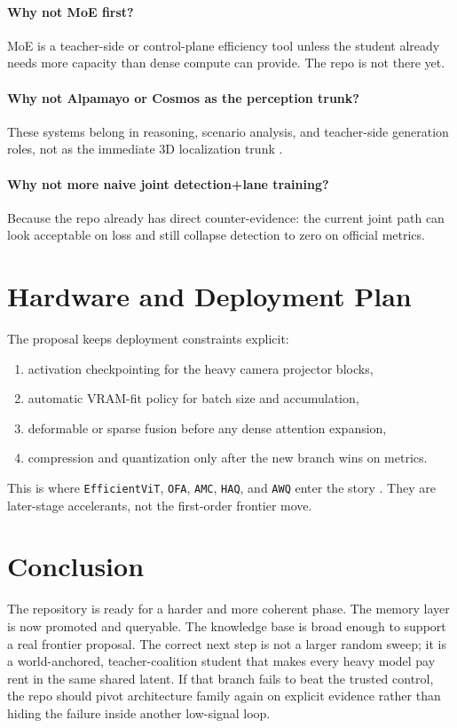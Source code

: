 \documentclass[11pt]{article}
\begin{document}
\paragraph{Why not MoE first?}
MoE is a teacher-side or control-plane efficiency tool unless the student already needs more
capacity than dense compute can provide. The repo is not there yet.

\paragraph{Why not Alpamayo or Cosmos as the perception trunk?}
These systems belong in reasoning, scenario analysis, and teacher-side generation roles, not as the
immediate 3D localization trunk \cite{alpamayo,cosmosreason,cosmospredict}.

\paragraph{Why not more naive joint detection+lane training?}
Because the repo already has direct counter-evidence: the current joint path can look acceptable on
loss and still collapse detection to zero on official metrics.

\section{Hardware and Deployment Plan}
The proposal keeps deployment constraints explicit:
\begin{enumerate}[leftmargin=*,itemsep=2pt]
\item activation checkpointing for the heavy camera projector blocks,
\item automatic VRAM-fit policy for batch size and accumulation,
\item deformable or sparse fusion before any dense attention expansion,
\item compression and quantization only after the new branch wins on metrics.
\end{enumerate}

This is where \texttt{EfficientViT}, \texttt{OFA}, \texttt{AMC}, \texttt{HAQ}, and \texttt{AWQ}
enter the story \cite{efficientvit,ofa,amc,haq,awq}. They are later-stage accelerants, not the
first-order frontier move.

\section{Conclusion}
The repository is ready for a harder and more coherent phase. The memory layer is now promoted and
queryable. The knowledge base is broad enough to support a real frontier proposal. The correct next
step is not a larger random sweep; it is a world-anchored, teacher-coalition student that makes
every heavy model pay rent in the same shared latent. If that branch fails to beat the trusted
control, the repo should pivot architecture family again on explicit evidence rather than hiding the
failure inside another low-signal loop.
\end{document}
